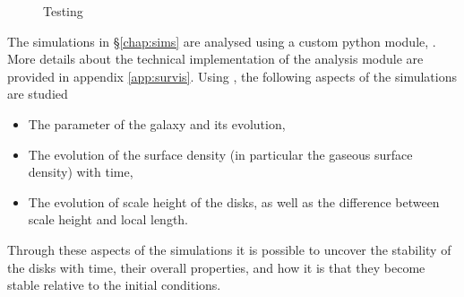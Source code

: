 \begin{figure}[!ht]
    \leavevmode\rlap{\usebox{\graphicsbox}}%
    \begin{minipage}[b]{0.63\wd\graphicsbox}%
        \caption{Testing}
        \label{fig:toomqsimbigfig}
    \end{minipage}\hspace*{0.33\wd\graphicsbox}%
\end{figure}

The simulations in \S\ref{chap:sims} are analysed using a custom python module, \sv. 
More details about the technical implementation of the analysis module are provided in appendix \ref{app:survis}.
Using \sv, the following aspects of the simulations are studied
\begin{itemize}
\item The \citet{toomre_on_1964} parameter of the galaxy and its evolution,
\item The evolution of the surface density (in particular the gaseous surface density) with time,
\item The evolution of scale height of the disks, as well as the difference between scale height and local \citet{jeans_stability_1902} length.
\end{itemize}
Through these aspects of the simulations it is possible to uncover the stability of the disks with time, their overall properties, and how it is that they become stable relative to the initial conditions.


